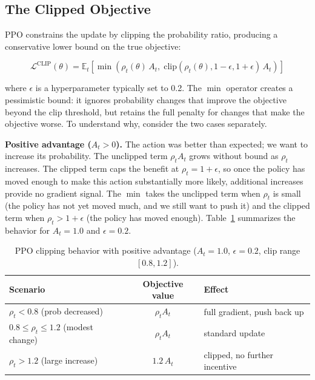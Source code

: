 \documentclass{book}
\begin{document}
\subsection{The Clipped Objective}
\label{sec:clipped_objective}

PPO constrains the update by clipping the probability ratio, producing a
conservative lower bound on the true objective:

\begin{equation}
\label{eq:ppo_clip}
\mathcal{L}^{\text{CLIP}}(\theta)
= \mathbb{E}_t\!\left[
    \min\!\left(
        \rho_t(\theta)\, A_t,\;
        \mathrm{clip}(\rho_t(\theta), 1-\epsilon, 1+\epsilon)\, A_t
    \right)
\right]
\end{equation}

where $\epsilon$ is a hyperparameter typically set to 0.2. The $\min$
operator creates a pessimistic bound: it ignores probability changes that
improve the objective beyond the clip threshold, but retains the full
penalty for changes that make the objective worse. To understand why,
consider the two cases separately.

\textbf{Positive advantage ($A_t > 0$).} The action was better than
expected; we want to increase its probability. The unclipped term
$\rho_t A_t$ grows without bound as $\rho_t$ increases. The clipped term
caps the benefit at $\rho_t = 1 + \epsilon$, so once the policy has moved
enough to make this action substantially more likely, additional increases
provide no gradient signal. The $\min$ takes the unclipped term when
$\rho_t$ is small (the policy has not yet moved much, and we still want to
push it) and the clipped term when $\rho_t > 1 + \epsilon$ (the policy
has moved enough). Table~\ref{tab:ppo_positive} summarizes the behavior
for $A_t = 1.0$ and $\epsilon = 0.2$.

\begin{table}[htbp]
\centering
\caption{PPO clipping behavior with positive advantage ($A_t = 1.0$,
    $\epsilon = 0.2$, clip range $[0.8, 1.2]$).}
\label{tab:ppo_positive}
\renewcommand{\arraystretch}{1.2}
\begin{tabular}{lcl}
\hline
\textbf{Scenario} & \textbf{Objective value} & \textbf{Effect} \\
\hline
$\rho_t < 0.8$ (prob decreased)         & $\rho_t A_t$   & full gradient, push back up \\
$0.8 \le \rho_t \le 1.2$ (modest change)& $\rho_t A_t$   & standard update \\
$\rho_t > 1.2$ (large increase)          & $1.2\, A_t$    & clipped, no further incentive \\
\hline
\end{tabular}
\end{table}
\end{document}

